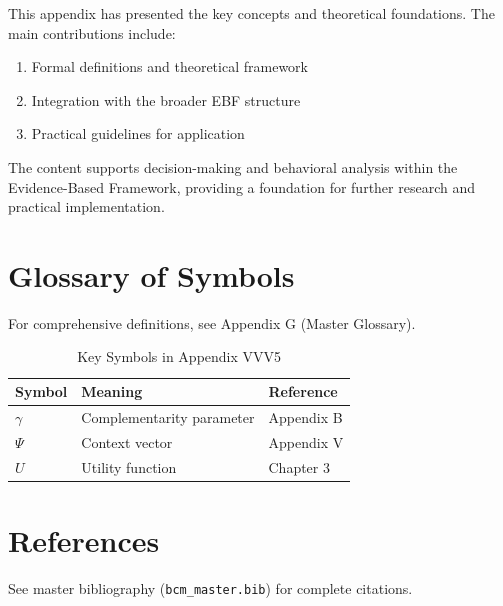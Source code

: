 This appendix has presented the key concepts and theoretical foundations.
The main contributions include:

\begin{enumerate}
    \item Formal definitions and theoretical framework
    \item Integration with the broader EBF structure
    \item Practical guidelines for application
\end{enumerate}

The content supports decision-making and behavioral analysis within the
Evidence-Based Framework, providing a foundation for further research
and practical implementation.


\section{Glossary of Symbols}
\label{sec:vvv5-glossary}

For comprehensive definitions, see Appendix G (Master Glossary).

\begin{table}[htbp]
\centering
\caption{Key Symbols in Appendix VVV5}
\begin{tabular}{lll}
\toprule
\textbf{Symbol} & \textbf{Meaning} & \textbf{Reference} \\
\midrule
$\gamma$ & Complementarity parameter & Appendix B \\
$\Psi$ & Context vector & Appendix V \\
$U$ & Utility function & Chapter 3 \\
\bottomrule
\end{tabular}
\end{table}


\section{References}
\label{sec:references}

See master bibliography (\texttt{bcm\_master.bib}) for complete citations.

\nocite{bcm_master}

